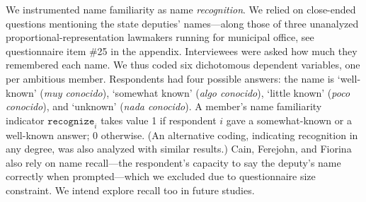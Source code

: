 \documentclass[letter,12pt]{article}
\newcommand{\mc}{\multicolumn}
\begin{document}

We instrumented name familiarity as name \emph{recognition}. We relied on close-ended questions mentioning the state deputies' names---along those of three unanalyzed proportional-representation lawmakers running for municipal office, see questionnaire item \#25 in the appendix. Interviewees were asked how much they remembered each name. We thus coded six dichotomous dependent variables, one per ambitious member. Respondents had four possible answers: the name is `well-known' (\emph{muy conocido}), `somewhat known' (\emph{algo conocido}), `little known' (\emph{poco conocido}), and `unknown' (\emph{nada conocido}). A member's name familiarity indicator $\texttt{recognize}_i$ takes value 1 if respondent $i$ gave a somewhat-known or a well-known answer; 0 otherwise. (An alternative coding, indicating recognition in any degree, was also analyzed with similar results.) Cain, Ferejohn, and Fiorina also rely on name recall---the respondent's capacity to say the deputy's name correctly when prompted---which we excluded due to questionnaire size constraint. We intend explore recall too in future studies.
\end{document}

